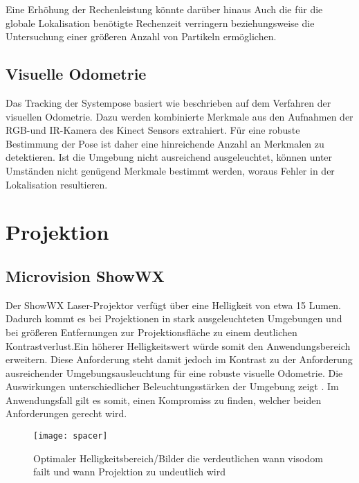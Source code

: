 Eine Erhöhung der Rechenleistung könnte darüber hinaus Auch die für die globale Lokalisation benötigte Rechenzeit verringern beziehungsweise die Untersuchung einer größeren Anzahl von Partikeln ermöglichen.\\

\subsection{Visuelle Odometrie}
Das Tracking der Systempose basiert wie beschrieben auf dem Verfahren der visuellen Odometrie. Dazu werden kombinierte Merkmale aus den Aufnahmen der RGB-und IR-Kamera des Kinect Sensors extrahiert. Für eine robuste Bestimmung der Pose ist daher eine hinreichende Anzahl an Merkmalen zu detektieren. Ist die Umgebung nicht ausreichend ausgeleuchtet, können unter Umständen nicht genügend Merkmale bestimmt werden, woraus Fehler in der Lokalisation resultieren. 

\section{Projektion}

\subsection{Microvision ShowWX}
Der ShowWX Laser-Projektor verfügt über eine Helligkeit von etwa 15 Lumen. Dadurch kommt es bei Projektionen in stark ausgeleuchteten Umgebungen und bei größeren Entfernungen zur Projektionsfläche zu einem deutlichen Kontrastverlust.\red[ Bild?] Ein höherer Helligkeitswert würde somit den Anwendungsbereich erweitern. Diese Anforderung steht damit jedoch im Kontrast zu der Anforderung ausreichender Umgebungsausleuchtung für eine robuste visuelle Odometrie. Die Auswirkungen unterschiedlicher Beleuchtungsstärken der Umgebung zeigt . Im Anwendungsfall gilt es somit, einen Kompromiss zu finden, welcher beiden Anforderungen gerecht wird.\\

\begin{figure}[!ht]
	\begin{center}
		\texttt{[image: spacer]}
		\caption{Optimaler Helligkeitsbereich/Bilder die verdeutlichen wann visodom failt und wann Projektion zu undeutlich wird}
		\label{fig.optlight}
	\end{center}
\end{figure}

